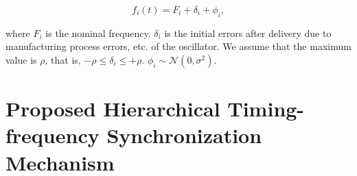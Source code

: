 \documentclass[conference]{IEEEtran}
\begin{document}
\begin{equation}
f_i(t)=F_i+\delta_i+\phi_i, \label {eq2}
\end{equation}

\noindent where $F_i$ is the nominal frequency. $\delta_i$ is the initial errors after delivery due to manufacturing process errors, etc. of the oscillator. We assume that the maximum value is $\rho$, that is, $- \rho \le \delta_i \le + \rho$. $\phi_i \sim \mathcal N(0,\sigma^2)$.


\section{Proposed Hierarchical Timing-frequency Synchronization Mechanism}
\end{document}
